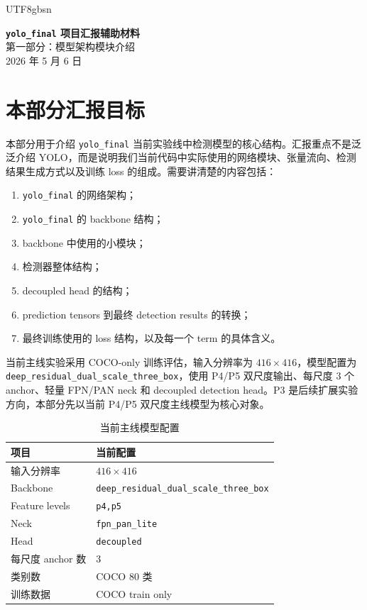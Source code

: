 \documentclass[11pt,a4paper]{article}
\newcommand{\code}[1]{\texttt{#1}}
\begin{document}
\begin{CJK*}{UTF8}{gbsn}

\begin{center}
  {\LARGE \textbf{\code{yolo\_final} 项目汇报辅助材料}}\\[0.8em]
  {\Large 第一部分：模型架构模块介绍}\\[0.8em]
  {\normalsize 2026 年 5 月 6 日}
\end{center}

\vspace{1em}

\section*{本部分汇报目标}

本部分用于介绍 \code{yolo\_final} 当前实验线中检测模型的核心结构。汇报重点不是泛泛介绍 YOLO，而是说明我们当前代码中实际使用的网络模块、张量流向、检测结果生成方式以及训练 loss 的组成。需要讲清楚的内容包括：

\begin{enumerate}
  \item \code{yolo\_final} 的网络架构；
  \item \code{yolo\_final} 的 backbone 结构；
  \item backbone 中使用的小模块；
  \item 检测器整体结构；
  \item decoupled head 的结构；
  \item prediction tensors 到最终 detection results 的转换；
  \item 最终训练使用的 loss 结构，以及每一个 term 的具体含义。
\end{enumerate}

当前主线实验采用 COCO-only 训练评估，输入分辨率为 $416 \times 416$，模型配置为 \code{deep\_residual\_dual\_scale\_three\_box}，使用 P4/P5 双尺度输出、每尺度 3 个 anchor、轻量 FPN/PAN neck 和 decoupled detection head。P3 是后续扩展实验方向，本部分先以当前 P4/P5 双尺度主线模型为核心对象。

\begin{table}[h]
\centering
\caption{当前主线模型配置}
\begin{tabular}{ll}
\toprule
项目 & 当前配置 \\
\midrule
输入分辨率 & $416 \times 416$ \\
Backbone & \code{deep\_residual\_dual\_scale\_three\_box} \\
Feature levels & \code{p4,p5} \\
Neck & \code{fpn\_pan\_lite} \\
Head & \code{decoupled} \\
每尺度 anchor 数 & 3 \\
类别数 & COCO 80 类 \\
训练数据 & COCO train only \\
\bottomrule
\end{tabular}
\end{table}


\end{CJK*}
\end{document}
